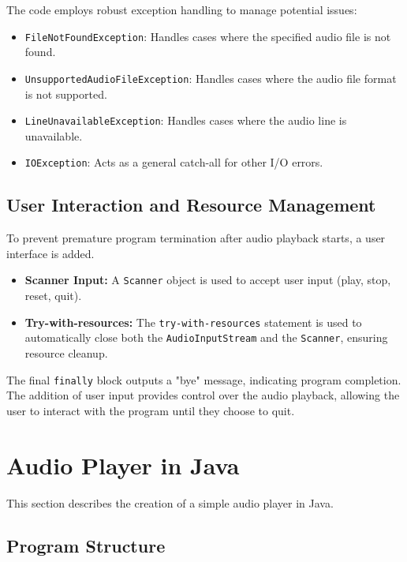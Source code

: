 \documentclass{article}
\begin{document}
\begin{itemize}
The code employs robust exception handling to manage potential issues:

\begin{itemize}
    \item \texttt{FileNotFoundException}: Handles cases where the specified audio file is not found.
    \item \texttt{UnsupportedAudioFileException}: Handles cases where the audio file format is not supported.
    \item \texttt{LineUnavailableException}: Handles cases where the audio line is unavailable.
    \item \texttt{IOException}: Acts as a general catch-all for other I/O errors.
\end{itemize}

\subsection{User Interaction and Resource Management}

To prevent premature program termination after audio playback starts, a user interface is added.

\begin{itemize}
    \item \textbf{Scanner Input:} A \texttt{Scanner} object is used to accept user input (play, stop, reset, quit).
    \item \textbf{Try-with-resources:} The \texttt{try-with-resources} statement is used to automatically close both the \texttt{AudioInputStream} and the \texttt{Scanner}, ensuring resource cleanup.
\end{itemize}

The final \texttt{finally} block outputs a "bye" message, indicating program completion.  The addition of user input provides control over the audio playback, allowing the user to interact with the program until they choose to quit.


\section{Audio Player in Java}

This section describes the creation of a simple audio player in Java.

\subsection{Program Structure}


\end{itemize}
\end{document}
